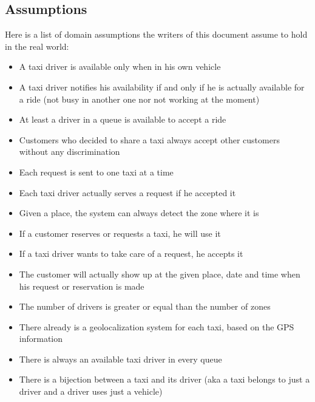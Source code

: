\pagebreak

\subsection{Assumptions}
Here is a list of domain assumptions the writers of this document assume to hold in the real world:
\begin{itemize}
    \item A taxi driver is available only when in his own vehicle 
    \item A taxi driver notifies his availability if and only if he is actually available for a ride (not busy in another one nor not working at the moment)
    \item At least a driver in a queue is available to accept a ride
    \item Customers who decided to share a taxi always accept other customers without any discrimination
    \item Each request is sent to one taxi at a time
    \item Each taxi driver actually serves a request if he accepted it
    \item Given a place, the system can always detect the zone where it is
    \item If a customer reserves or requests a taxi, he will use it
    \item If a taxi driver wants to take care of a request, he accepts it
    \item The customer will actually show up at the given place, date and time when his request or reservation is made
    \item The number of drivers is greater or equal than the number of zones
    \item There already is a geolocalization system for each taxi, based on the GPS information
    \item There is always an available taxi driver in every queue
    \item There is a bijection between a taxi and its driver (aka a taxi belongs to just a driver and a driver uses just a vehicle)
\end{itemize}
